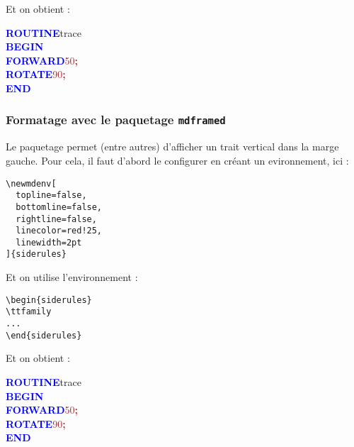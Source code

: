 Et on obtient :

\resetlinenumber
\begin{linenumbers}\singlespacing\ttfamily
\textcolor{blue}{\bf ROUTINE}\hspace*{.6em}t{}r{}a{}c{}e{} \\
\textcolor{blue}{\bf BEGIN} \\
\hspace*{1.2em}\textcolor{blue}{\bf FORWARD}\hspace*{.6em}\textcolor{brown}{5{}0{}}\textcolor{brown}{\bf ;} \\
\hspace*{1.2em}\textcolor{blue}{\bf ROTATE}\hspace*{.6em}\textcolor{brown}{9{}0{}}\textcolor{brown}{\bf ;} \\
\textcolor{blue}{\bf END}
\end{linenumbers}

\subsubsection{Formatage avec le paquetage \texttt{mdframed}}

Le paquetage  permet (entre autres) d'afficher un trait vertical dans la marge gauche. Pour cela, il faut d'abord le configurer en créant un evironnement, ici  :

\begin{verbatim}
\newmdenv[
  topline=false,
  bottomline=false,
  rightline=false,
  linecolor=red!25,
  linewidth=2pt
]{siderules}
\end{verbatim}

Et on utilise l'environnement  :

\begin{verbatim}
\begin{siderules}
\ttfamily
...
\end{siderules}
\end{verbatim}

Et on obtient :

{

\begin{siderulesRed}
\ttfamily
\textcolor{blue}{\bf ROUTINE}\hspace*{.6em}t{}r{}a{}c{}e{} \\
\textcolor{blue}{\bf BEGIN} \\
\hspace*{1.2em}\textcolor{blue}{\bf FORWARD}\hspace*{.6em}\textcolor{brown}{5{}0{}}\textcolor{brown}{\bf ;} \\
\hspace*{1.2em}\textcolor{blue}{\bf ROTATE}\hspace*{.6em}\textcolor{brown}{9{}0{}}\textcolor{brown}{\bf ;} \\
\textcolor{blue}{\bf END}
\end{siderulesRed}
}

